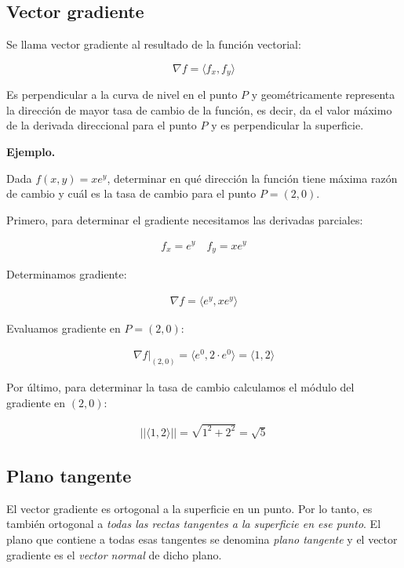 \subsection{Vector gradiente}

Se llama vector gradiente al resultado de la función vectorial:

\begin{equation*}
    \nabla f = \langle f_x, f_y \rangle
\end{equation*}

Es perpendicular a la curva de nivel en el punto \(P\)
y geométricamente representa la dirección de mayor tasa de cambio de la función,
es decir,
da el valor máximo de la derivada direccional para el punto \(P\)
y es perpendicular la superficie.

\vspace{.5cm}
\textbf{Ejemplo.}

Dada \(f(x,y)=xe^{y}\),
determinar en qué dirección la función tiene máxima razón de cambio
y cuál es la tasa de cambio para el punto \(P = (2,0)\).

Primero,
para determinar el gradiente necesitamos las derivadas parciales:

\begin{align*}
    f_x = e^{y} \quad f_y = xe^{y}
\end{align*}

Determinamos gradiente:

\begin{align*}
    \nabla f = \langle e^{y}, xe^{y} \rangle
\end{align*}

Evaluamos gradiente en \(P = (2,0)\):

\begin{align*}
    \nabla f|_{(2,0)} = \langle e^{0}, 2\cdot e^{0} \rangle = \langle1,2\rangle
\end{align*}

Por último,
para determinar la tasa de cambio calculamos el módulo del gradiente en \((2,0)\):

\begin{align*}
    ||\langle1,2\rangle|| = \sqrt{1^{2} + 2^{2}} = \boxed{\sqrt{5}}
\end{align*}

\subsection{Plano tangente}

El vector gradiente es ortogonal a la superficie en un punto.
Por lo tanto,
es también ortogonal a \textit{todas las rectas tangentes a la superficie en
    ese punto}.
El plano que contiene a todas esas tangentes se denomina \textit{plano tangente}
y el vector gradiente es el \textit{vector normal} de dicho plano.

